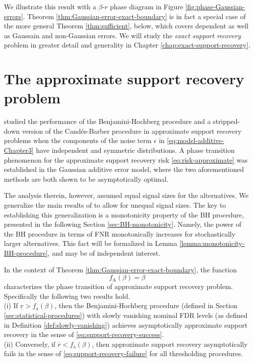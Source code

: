 We illustrate this result with a $\beta$-$r$ phase diagram in Figure \ref{fig:phase-Gaussian-errors}.  Theorem \ref{thm:Gaussian-error-exact-boundary} is in 
fact a special case of the more general Theorem \ref{thm:sufficient}, below, which covers dependent as well as Gaussain and non-Gaussian errors.  We will study the {\em exact support recovery} problem in greater detail and generality in Chapter \ref{chap:exact-support-recovery}. 


\section{The approximate support recovery problem}
\label{subsec:approx-support-recovery-Gaussian}

\cite{arias2017distribution} studied the performance of the Benjamini-Hochberg procedure \citep{benjamini1995controlling} and a stripped-down version of the Cand\'es-Barber procedure \citep{barber2015controlling} in approximate support recovery problems when the components of the noise term $\epsilon$ in \eqref{eq:model-additive-Chapter3} have independent and symmetric distributions.
A phase transition phenomenon for the approximate support recovery risk \eqref{eq:risk-approximate} was established in the Gaussian additive error model, where the two aforementioned methods are both shown to be asymptotically optimal.

The analysis therein, however, assumed equal signal sizes for the alternatives.
We generalize the main results of \citet{arias2017distribution} to allow for unequal signal sizes. 
The key to establishing this generalization is a monotonicity property of the \ac{BH} procedure, presented in the following 
Section \ref{sec:BH-monotonicity}. Namely, the power of the \ac{BH} procedure in terms of FNR monotonically increases for stochastically 
larger alternatives. This fact will be formalized in Lemma \ref{lemma:monotonicity-BH-procedure}, and may be of independent interest.


\begin{theorem} \label{thm:Gaussian-error-approx-boundary}
In the context of Theorem \ref{thm:Gaussian-error-exact-boundary}, the function 
\begin{equation} \label{eq:approx-boundary-Gaussian}
    f_{\mathrm{A}}(\beta) = \beta
\end{equation}
characterizes the phase transition of approximate support recovery problem.  Specifically the following two results hold.\\

{\rm (i)} If $\underline{r} > f_{\mathrm{a}}(\beta)$, then the Benjamini-Hochberg procedure (defined in Section \ref{sec:statistical-procedures}) with slowly 
vanishing nominal FDR levels (as defined in Definition \ref{def:slowly-vanishing}) achieves asymptotically approximate support recovery in the sense of \eqref{eq:support-recovery-success}.\\ 

{\rm (ii)}
Conversely, if $\overline{r} < f_{\mathrm{a}}(\beta)$, then approximate support recovery asymptotically fails in the sense of \eqref{eq:support-recovery-failure} for all thresholding procedures.
\end{theorem}


